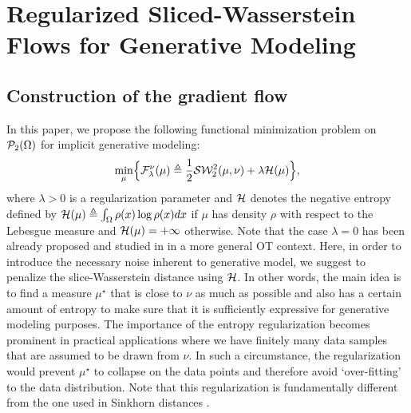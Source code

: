 
\section{Regularized Sliced-Wasserstein Flows for Generative Modeling}


\subsection{Construction of the gradient flow}



%

In this paper, we propose the following functional minimization problem on ${\cal P}_2(\Omega)$ for implicit generative modeling:
\begin{equation}
 \min_{\mu} \Bigl\{ {\cal F}^{\nu}_\lambda(\mu) \triangleq  \frac1{2} {\cal S}{\cal W}_2^2(\mu, \nu) + \lambda {\cal H}(\mu) \Bigr\},  \label{eqn:sw_optim}
\end{equation}
where $\lambda >0$ is a regularization parameter and ${\cal H}$ denotes the negative entropy defined by ${\cal H}(\mu) \triangleq \int_{\Omega} \rho(x) \log \rho(x) dx $ if $\mu$ has density $\rho$ with respect to the Lebesgue measure and ${\cal H}(\mu) = + \infty$ otherwise. Note that the case $\lambda =0$ has been already proposed and studied in \cite{bonnotte2013unidimensional} in a more general OT context. Here, in order to introduce the necessary noise inherent to generative model, we suggest to penalize the slice-Wasserstein distance using ${\cal H}$. In other words, the main idea is to find a measure $\mu^\star$ that is close to $\nu$ as much as possible and also has a certain amount of entropy to make sure that it is sufficiently expressive for generative modeling purposes.
The importance of the entropy regularization becomes prominent in practical applications where we have finitely many data samples that are assumed to be drawn from $\nu$. In such a circumstance, the regularization would prevent $\mu^\star$ to collapse on the data points and therefore avoid `over-fitting' to the data distribution. Note that this regularization is fundamentally different from the one used in Sinkhorn distances \cite{genevay2018learning}.


